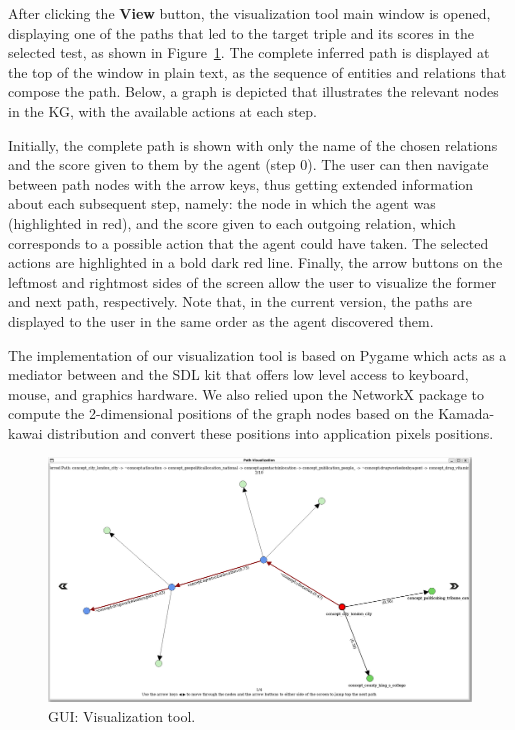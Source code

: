 After clicking the \textbf{View} button,  the visualization tool main window is opened, displaying one of the paths that led to the target triple and its scores in the selected test, as shown in Figure~\ref{fig:visualizer}. The complete inferred path is displayed at the top of the window in plain text, as the sequence of entities and relations that compose the path. Below, a graph is depicted that illustrates the relevant nodes in the KG, with the available actions at each step. 

Initially, the complete path is shown with only the name of the chosen relations and the score given to them by the agent (step 0). The user can then navigate between path nodes with the arrow keys, thus getting extended information about each subsequent step, namely: the node in which the agent was (highlighted in red), and the score given to each outgoing relation, which corresponds to a possible action that the agent could have taken. The selected actions are highlighted in a bold dark red line. Finally, the arrow buttons on the leftmost and rightmost sides of the screen allow the user to visualize the former and next path, respectively. Note that, in the current version, the paths are displayed to the user in the same order as the agent discovered them.

The implementation of our visualization tool is based on Pygame 
which acts as a mediator between \toolname{} and the SDL kit 
that offers low level access to keyboard, mouse, and graphics hardware. We also relied upon the NetworkX package 
to compute the 2-dimensional positions of the graph nodes based on the Kamada-kawai distribution 
and convert these positions into application pixels positions.

\begin{landscape}
    \begin{figure}[!h]
        \centering
        \includegraphics[width=1.65\textwidth]{fig/framework/GUI/Visualizer_2}
        \caption{\toolname{} GUI: Visualization tool.}
        \label{fig:visualizer}
    \end{figure}
\end{landscape}

